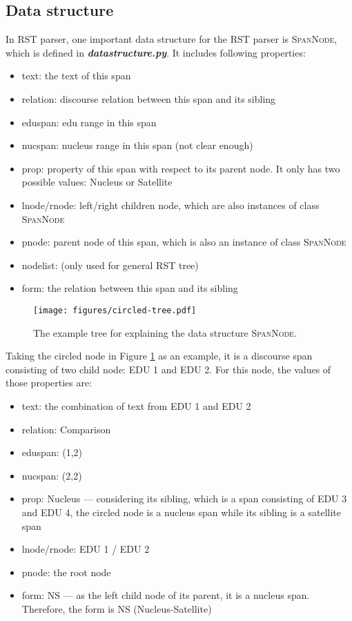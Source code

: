 \documentclass[12pt]{article}
\newcommand{\codefile}[1]{\textbf{\textit{#1}}}
\newcommand{\codeclass}[1]{\textsc{#1}}
\begin{document}
\subsection{Data structure}
In RST parser, one important data structure for the RST parser is \codeclass{SpanNode}, which is defined in \codefile{datastructure.py}. It includes following properties:
\begin{itemize}
\item text: the text of this span
\item relation: discourse relation between this span and its sibling
\item eduspan: edu range in this span
\item nucspan: nucleus range in this span (not clear enough)
\item prop: property of this span with respect to its parent node. It only has two possible values: Nucleus or Satellite
\item lnode/rnode: left/right children node, which are also instances of class \codeclass{SpanNode}
\item pnode: parent node of this span, which is also an instance of class \codeclass{SpanNode}
\item nodelist: (only used for general RST tree)
\item form: the relation between this span and its sibling
\end{itemize}

\begin{figure}[H]
  \centering
  \texttt{[image: figures/circled-tree.pdf]}
  \caption{The example tree for explaining the data structure \codeclass{SpanNode}.}
  \label{fig:circled}
\end{figure}

Taking the circled node in Figure \ref{fig:circled} as an example, it is a discourse span consisting of two child node: EDU 1 and EDU 2. For this node, the values of those properties are:
\begin{itemize}
\item text: the combination of text from EDU 1 and EDU 2
\item relation: Comparison
\item eduspan: (1,2)
\item nucspan: (2,2)
\item prop: Nucleus --- considering its sibling, which is a span consisting of EDU 3 and EDU 4, the circled node is a nucleus span while its sibling is a satellite span
\item lnode/rnode: EDU 1 / EDU 2
\item pnode: the root node
\item form: NS --- as the left child node of its parent, it is a nucleus span. Therefore, the form is NS (Nucleus-Satellite)
\end{itemize}
\end{document}
